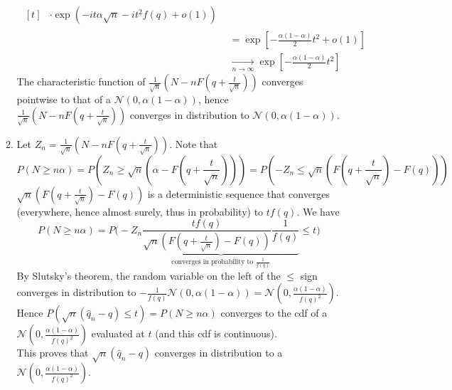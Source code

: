 \documentclass[a4paper,11pt]{article}
\begin{document}
\begin{enumerate}
\begin{enumerate}
$$\begin{aligned}
\begin{aligned}[t]
    &\cdot \exp\left(-it\alpha \sqrt n -it^2 f(q) +o(1)\right)
    \end{aligned}\\
    &= \exp\left[-\frac{\alpha(1-\alpha)}2t^2 + o(1) \right]\\
    &\xrightarrow[n\to \infty]{} \exp\left[-\frac{\alpha(1-\alpha)}2t^2 \right]
    \end{aligned}
    $$
    The characteristic function of $\frac{1}{\sqrt{n}}\left(N-n F\left(q+\frac t{\sqrt{n}}\right)\right)$ converges pointwise to that of a $\mathcal N(0,\alpha(1-\alpha))$, hence $\frac{1}{\sqrt{n}}\left(N-n F\left(q+\frac t{\sqrt{n}}\right)\right)$ converges in distribution to $\mathcal N(0,\alpha(1-\alpha))$.
    \\
    \item Let $Z_n = \frac{1}{\sqrt{n}}\left(N-n F\left(q+\frac t{\sqrt{n}}\right)\right)$. Note that 
    $$P(N\geq n\alpha) = P\left(Z_n\geq \sqrt n \left(\alpha - F\left(q+\frac t{\sqrt{n}}\right) \right)\right) = P\left(-Z_n\leq \sqrt n \left(F\left(q+\frac t{\sqrt{n}}\right) - F(q) \right)\right)$$
    $\displaystyle \sqrt n \left(F\left(q+\frac t{\sqrt{n}}\right) - F(q) \right)$ is a deterministic sequence that converges (everywhere, hence almost surely, thus in probability) to $tf(q)$. We have 
    $$P(N\geq n\alpha) = P\bigg(-Z_n \underbrace{\frac{tf(q)}{\sqrt n \left(F\left(q+\frac t{\sqrt{n}}\right) - F(q) \right)} \frac{1}{f(q)}}_{\text{converges in probability to }\frac{1}{f(q)}} \leq t\bigg)$$
    By Slutsky's theorem, the random variable on the left of the $\leq$ sign converges in distribution to $-\frac{1}{f(q)} \mathcal N(0,\alpha(1-\alpha)) = \mathcal N(0,\frac{\alpha(1-\alpha)}{f(q)^2})$.\\
    Hence $P(\sqrt{n}\left(\hat{q}_{n}-q\right) \leq t) = P(N\geq n\alpha)$ converges to the cdf of a $\mathcal N(0,\frac{\alpha(1-\alpha)}{f(q)^2})$ evaluated at $t$ (and this cdf is continuous).\\
    This proves that $\sqrt{n}\left(\hat{q}_{n}-q\right)$ converges in distribution to a $\mathcal N(0,\frac{\alpha(1-\alpha)}{f(q)^2})$.
  \end{enumerate}
\end{enumerate}
\end{document}
